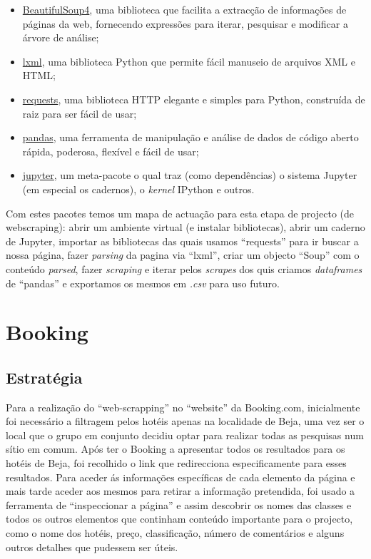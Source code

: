 \begin{itemize}
  \item \href{https://pypi.org/project/beautifulsoup4/}{BeautifulSoup4}, uma biblioteca que facilita a extracção de informações de páginas da web, fornecendo expressões para iterar, pesquisar e modificar a árvore de análise;
  \item \href{https://pypi.org/project/lxml/}{lxml}, uma biblioteca Python que permite fácil manuseio de arquivos XML e HTML;
  \item \href{https://pypi.org/project/requests/}{requests}, uma biblioteca HTTP elegante e simples para Python, construída de raiz para ser fácil de usar;
  \item \href{https://pypi.org/project/pandas/}{pandas}, uma ferramenta de manipulação e análise de dados de código aberto rápida, poderosa, flexível e fácil de usar;
  \item \href{pip install jupyter}{jupyter}, um meta-pacote o qual traz (como dependências) o sistema Jupyter (em especial os cadernos), o \textit{kernel} IPython e outros.
\end{itemize}

Com estes pacotes temos um mapa de actuação para esta etapa de projecto (de webscraping): abrir um ambiente virtual (e instalar bibliotecas), abrir um caderno de Jupyter, importar as bibliotecas das quais usamos ``requests'' para ir buscar a nossa página, fazer \textit{parsing} da pagina via ``lxml'', criar um objecto ``Soup'' com o conteúdo \textit{parsed}, fazer \textit{scraping} e iterar pelos \textit{scrapes} dos quis criamos \textit{dataframes} de ``pandas'' e exportamos os mesmos em \textit{.csv} para uso futuro.

\section{Booking}   
\subsection{Estratégia}
Para a realização do ``web-scrapping'' no ``website'' da Booking.com, inicialmente foi necessário a filtragem pelos hotéis apenas na localidade de Beja, uma vez ser o local que o grupo em conjunto decidiu optar para realizar todas as pesquisas num sítio em comum.
Após ter o Booking a apresentar todos os resultados para os hotéis de Beja, foi recolhido o link que redirecciona especificamente para esses resultados.
Para aceder ás informações específicas de cada elemento da página e mais tarde aceder aos mesmos para retirar a informação pretendida, foi usado a ferramenta de ``inspeccionar a página'' e assim descobrir os nomes das classes e todos os outros elementos que continham conteúdo importante para o projecto, como o nome dos hotéis, preço, classificação, número de comentários e alguns outros detalhes que pudessem ser úteis.

